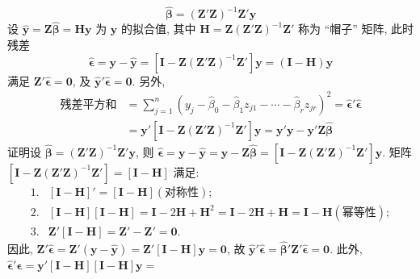 \[
\hat{\boldsymbol{\beta}}=(\mathbf{Z}'\mathbf{Z})^{-1}\mathbf{Z}'\mathbf{y}
\]
设 $\hat{\mathbf{y}}=\mathbf{Z}\hat{\boldsymbol{\beta}}=\mathbf{H}\mathbf{y}$ 为 $\mathbf{y}$ 的拟合值, 其中 $\mathbf{H}=\mathbf{Z}(\mathbf{Z}'\mathbf{Z})^{-1}\mathbf{Z}'$ 称为 ``帽子'' 矩阵, 此时残差
\[
\hat{\boldsymbol{\epsilon}}=\mathbf{y}-\hat{\mathbf{y}}=[\mathbf{I}-\mathbf{Z}(\mathbf{Z}'\mathbf{Z})^{-1}\mathbf{Z}']\mathbf{y}=(\mathbf{I}-\mathbf{H})\mathbf{y}
\]
满足 $\mathbf{Z}'\hat{\boldsymbol{\epsilon}}=\mathbf{0}$, 及 $\hat{\mathbf{y}}'\hat{\boldsymbol{\epsilon}}=\mathbf{0}$. 另外,
\begin{equation}
\begin{aligned}
\text{残差平方和}&=\sum_{j=1}^{n}(y_j-\hat{\beta}_0-\hat{\beta}_1 z_{j1}-\cdots-\hat{\beta}_r z_{jr})^2=\hat{\boldsymbol{\epsilon}}'\hat{\boldsymbol{\epsilon}}\\
&=\mathbf{y}'[\mathbf{I}-\mathbf{Z}(\mathbf{Z}'\mathbf{Z})^{-1}\mathbf{Z}']\mathbf{y}=\mathbf{y}'\mathbf{y}-\mathbf{y}'\mathbf{Z}\hat{\boldsymbol{\beta}}
\end{aligned}
\end{equation}
证明\quad 设 $\hat{\boldsymbol{\beta}}=(\mathbf{Z}'\mathbf{Z})^{-1}\mathbf{Z}'\mathbf{y}$, 则 $\hat{\boldsymbol{\epsilon}}=\mathbf{y}-\hat{\mathbf{y}}=\mathbf{y}-\mathbf{Z}\hat{\boldsymbol{\beta}}=[\mathbf{I}-\mathbf{Z}(\mathbf{Z}'\mathbf{Z})^{-1}\mathbf{Z}']\mathbf{y}$. 矩阵 $[\mathbf{I}-\mathbf{Z}(\mathbf{Z}'\mathbf{Z})^{-1}\mathbf{Z}']=[\mathbf{I}-\mathbf{H}]$ 满足:
\label{eq:7-6}
\begin{equation}
\begin{array}{ll}
1. & [\mathbf{I}-\mathbf{H}]'=[\mathbf{I}-\mathbf{H}](\text{对称性});\\
2. & [\mathbf{I}-\mathbf{H}][\mathbf{I}-\mathbf{H}]=\mathbf{I}-2\mathbf{H}+\mathbf{H}^2=\mathbf{I}-2\mathbf{H}+\mathbf{H}=\mathbf{I}-\mathbf{H}(\text{幂等性});\\
3. & \mathbf{Z}'[\mathbf{I}-\mathbf{H}]=\mathbf{Z}'-\mathbf{Z}'=\mathbf{0}.
\end{array}
\tag{7-6}
\end{equation}
因此, $\mathbf{Z}'\hat{\boldsymbol{\epsilon}}=\mathbf{Z}'(\mathbf{y}-\hat{\mathbf{y}})=\mathbf{Z}'[\mathbf{I}-\mathbf{H}]\mathbf{y}=\mathbf{0}$, 故 $\hat{\mathbf{y}}'\hat{\boldsymbol{\epsilon}}=\hat{\boldsymbol{\beta}}'\mathbf{Z}'\hat{\boldsymbol{\epsilon}}=\mathbf{0}$. 此外, $\hat{\boldsymbol{\epsilon}}'\hat{\boldsymbol{\epsilon}}=\mathbf{y}'[\mathbf{I}-\mathbf{H}][\mathbf{I}-\mathbf{H}]\mathbf{y}=$
